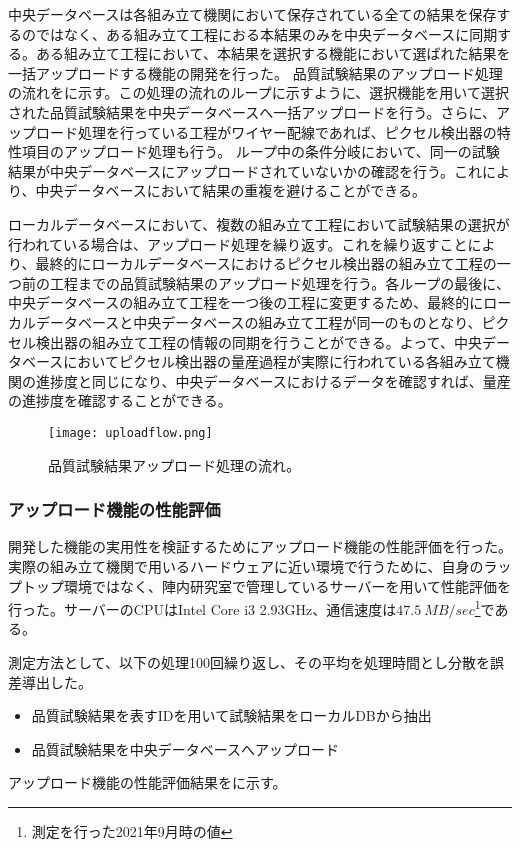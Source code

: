 中央データベースは各組み立て機関において保存されている全ての結果を保存するのではなく、ある組み立て工程におる本結果のみを中央データベースに同期する。ある組み立て工程において、本結果を選択する機能において選ばれた結果を一括アップロードする機能の開発を行った。
品質試験結果のアップロード処理の流れをに示す。この処理の流れのループに示すように、選択機能を用いて選択された品質試験結果を中央データベースへ一括アップロードを行う。さらに、アップロード処理を行っている工程がワイヤー配線であれば、ピクセル検出器の特性項目のアップロード処理も行う。
ループ中の条件分岐において、同一の試験結果が中央データベースにアップロードされていないかの確認を行う。これにより、中央データベースにおいて結果の重複を避けることができる。

ローカルデータベースにおいて、複数の組み立て工程において試験結果の選択が行われている場合は、アップロード処理を繰り返す。これを繰り返すことにより、最終的にローカルデータベースにおけるピクセル検出器の組み立て工程の一つ前の工程までの品質試験結果のアップロード処理を行う。各ループの最後に、中央データベースの組み立て工程を一つ後の工程に変更するため、最終的にローカルデータベースと中央データベースの組み立て工程が同一のものとなり、ピクセル検出器の組み立て工程の情報の同期を行うことができる。よって、中央データベースにおいてピクセル検出器の量産過程が実際に行われている各組み立て機関の進捗度と同じになり、中央データベースにおけるデータを確認すれば、量産の進捗度を確認することができる。

\begin{figure}[tbp]
  \centering
  \texttt{[image: uploadflow.png]}
  \caption[品質試験結果アップロード処理の流れ]{品質試験結果アップロード処理の流れ。}
  \label{fig:uploadresults}
\end{figure}


\subsubsection{アップロード機能の性能評価}

開発した機能の実用性を検証するためにアップロード機能の性能評価を行った。実際の組み立て機関で用いるハードウェアに近い環境で行うために、自身のラップトップ環境ではなく、陣内研究室で管理しているサーバーを用いて性能評価を行った。サーバーのCPUはIntel Core i3 2.93GHz、通信速度は$47.5\ \si{MB/sec}$\footnote{測定を行った2021年9月時の値}である。

測定方法として、以下の処理100回繰り返し、その平均を処理時間とし分散を誤差導出した。
\begin{itemize}
  \item[1. ] 品質試験結果を表すIDを用いて試験結果をローカルDBから抽出
  \item[2. ] 品質試験結果を中央データベースへアップロード
\end{itemize}
アップロード機能の性能評価結果をに示す。

